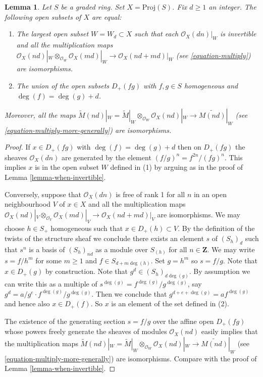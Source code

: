 \documentclass{stacks-project}
\theoremstyle{plain}
\newtheorem{lemma}[subsection]{Lemma}
\theoremstyle{definition}
\theoremstyle{remark}
\numberwithin{equation}{subsection}
\begin{document}
\begin{lemma}
\label{lemma-where-invertible}
Let $S$ be a graded ring. Set $X = \text{Proj}(S)$. Fix $d \geq 1$ an
integer. The following open subsets of $X$ are equal:
\begin{enumerate}
\item The largest open subset $W = W_d \subset X$ such that
each $\mathcal{O}_X(dn)|_W$ is invertible and all the
multiplication maps
$\mathcal{O}_X(nd)|_W \otimes_{\mathcal{O}_W} \mathcal{O}_X(md)|_W
\to \mathcal{O}_X(nd + md)|_W$
(see \ref{equation-multiply}) are isomorphisms.
\item The union of the open subsets $D_{+}(fg)$ with
$f, g \in S$ homogeneous and $\deg(f) = \deg(g) + d$.
\end{enumerate}
Moreover, all the maps
$\widetilde M(nd)|_W = \widetilde M|_W \otimes_{\mathcal{O}_W}
\mathcal{O}_X(nd)|_W \to \widetilde{M(nd)}|_W$
(see \ref{equation-multiply-more-generally}) are isomorphisms.
\end{lemma}

\begin{proof}
If $x \in D_{+}(fg)$ with $\deg(f) = \deg(g) + d$ then
on $D_{+}(fg)$ the sheaves $\mathcal{O}_X(dn)$
are generated by the element $(f/g)^n = f^{2n}/(fg)^n$. This implies $x$
is in the open subset $W$ defined in (1) by arguing as in the
proof of Lemma \ref{lemma-when-invertible}.

\medskip\noindent
Conversely, suppose that $\mathcal{O}_X(dn)$ is free of rank 1
for all $n$ in an open neighbourhood $V$ of $x \in X$ and all the
multiplication maps
$\mathcal{O}_X(nd)|_V \otimes_{\mathcal{O}_V} \mathcal{O}_X(md)|_V
\to \mathcal{O}_X(nd + md)|_V$ are isomorphisms.
We may choose $h \in S_{+}$ homogeneous such that $x \in D_{+}(h) \subset V$.
By the definition of the twists of the structure sheaf we conclude there
exists an element $s$ of $(S_h)_d$ such that $s^n$ is a basis of $(S_h)_{nd}$
as a module over $S_{(h)}$ for all $n \in \mathbf{Z}$.
We may write
$s = f/h^m$ for some $m \geq 1$ and $f \in S_{d + m \deg(h)}$.
Set $g = h^m$ so $s = f/g$. Note that $x \in D_{+}(g)$ by construction.
Note that $g^d \in (S_h)_{d\deg(g)}$.
By assumption we can write this as a multiple of
$s^{\deg(g)} = f^{\deg(g)}/g^{\deg(g)}$, say
$g^d = a/g^e \cdot f^{\deg(g)}/g^{\deg(g)}$.
Then we conclude that $g^{d + e + \deg(g)} = a f^{\deg(g)}$
and hence also $x \in D_{+}(f)$. So $x$ is an element of the set defined
in (2).

\medskip\noindent
The existence of the generating section $s = f/g$ over
the affine open $D_{+}(fg)$ whose
powers freely generate the sheaves of modules
$\mathcal{O}_X(nd)$ easily implies that the multiplication maps
$\widetilde M(nd)|_W = \widetilde M|_W \otimes_{\mathcal{O}_W}
\mathcal{O}_X(nd)|_W \to \widetilde{M(nd)}|_W$
(see \ref{equation-multiply-more-generally})
are isomorphisms. Compare with the proof of Lemma \ref{lemma-when-invertible}.
\end{proof}
\end{document}
